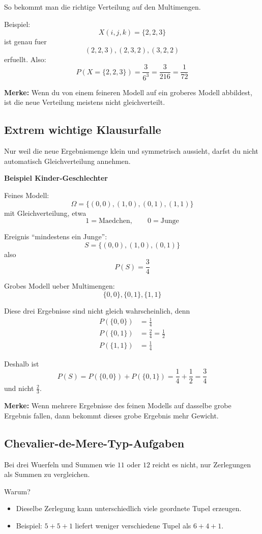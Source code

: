 \documentclass[a4paper,11pt]{article}
\begin{document}
So bekommt man die richtige Verteilung auf den Multimengen.

Beispiel:
\[
X(i,j,k)=\{2,2,3\}
\]
ist genau fuer
\[
(2,2,3), (2,3,2), (3,2,2)
\]
erfuellt. Also:
\[
P(X=\{2,2,3\})=\frac{3}{6^3}=\frac{3}{216}=\frac{1}{72}
\]

\textbf{Merke:}
Wenn du von einem feineren Modell auf ein groberes Modell abbildest, ist die neue Verteilung meistens nicht gleichverteilt.

\subsection{Extrem wichtige Klausurfalle}
Nur weil die neue Ergebnismenge klein und symmetrisch aussieht, darfst du nicht automatisch Gleichverteilung annehmen.

\textbf{Beispiel Kinder-Geschlechter}

Feines Modell:
\[
\Omega=\{(0,0),(1,0),(0,1),(1,1)\}
\]
mit Gleichverteilung, etwa
\[
1=\text{Maedchen}, \qquad 0=\text{Junge}
\]

Ereignis ``mindestens ein Junge'':
\[
S=\{(0,0),(1,0),(0,1)\}
\]
also
\[
P(S)=\frac{3}{4}
\]

Grobes Modell ueber Multimengen:
\[
\{0,0\}, \{0,1\}, \{1,1\}
\]

Diese drei Ergebnisse sind nicht gleich wahrscheinlich, denn
\begin{align*}
P(\{0,0\}) &= \frac{1}{4} \\
P(\{0,1\}) &= \frac{2}{4}=\frac{1}{2} \\
P(\{1,1\}) &= \frac{1}{4}
\end{align*}

Deshalb ist
\[
P(S)=P(\{0,0\})+P(\{0,1\})=\frac{1}{4}+\frac{1}{2}=\frac{3}{4}
\]
und nicht $\frac{2}{3}$.

\textbf{Merke:}
Wenn mehrere Ergebnisse des feinen Modells auf dasselbe grobe Ergebnis fallen, dann bekommt dieses grobe Ergebnis mehr Gewicht.

\subsection{Chevalier-de-Mere-Typ-Aufgaben}
Bei drei Wuerfeln und Summen wie $11$ oder $12$ reicht es nicht, nur Zerlegungen als Summen zu vergleichen.

Warum?
\begin{itemize}
  \item Dieselbe Zerlegung kann unterschiedlich viele geordnete Tupel erzeugen.
  \item Beispiel: $5+5+1$ liefert weniger verschiedene Tupel als $6+4+1$.
\end{itemize}
\end{document}
